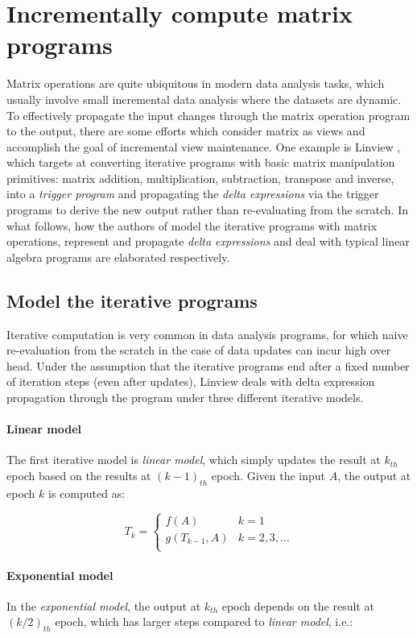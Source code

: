 \section{Incrementally compute matrix programs}
Matrix operations are quite ubiquitous in modern data analysis tasks, which usually involve small incremental data analysis where the datasets are dynamic. To effectively propagate the input changes through the matrix operation program to the output, there are some efforts which consider matrix as views and accomplish the goal of incremental view maintenance. One example is Linview \cite{nikolic2014linview}, which targets at converting iterative programs with basic matrix manipulation primitives: matrix addition, multiplication, subtraction, transpose and inverse, into a {\em trigger program} and propagating the {\em delta expressions} via the trigger programs to derive the new output rather than re-evaluating from the scratch. In what follows, how the authors of \cite{nikolic2014linview} model the iterative programs with matrix operations, represent and propagate {\em delta expressions} and deal with typical linear algebra programs are elaborated respectively.

\subsection{Model the iterative programs}\label{sec: iterative_model}
Iterative computation is very common in data analysis programs, for which naive re-evaluation from the scratch in the case of data updates can incur high over head. Under the assumption that the iterative programs end after a fixed number of iteration steps (even after updates), Linview deals with delta expression propagation through the program under three different iterative models.

\paragraph{Linear model} The first iterative model is {\em linear model}, which simply updates the result at $k_{th}$ epoch based on the results at $(k-1)_{th}$ epoch. Given the input $A$, the output at epoch $k$ is computed as:

\[T_k=
\begin{cases}
f(A)& k=1\\
g(T_{k-1}, A) & k=2,3,\dots\\
\end{cases}
\]

\paragraph{Exponential model} In the {\em exponential model}, the output at $k_{th}$ epoch depends on the result at $(k/2)_{th}$ epoch, which has larger steps compared to {\em linear model}, i.e.:

